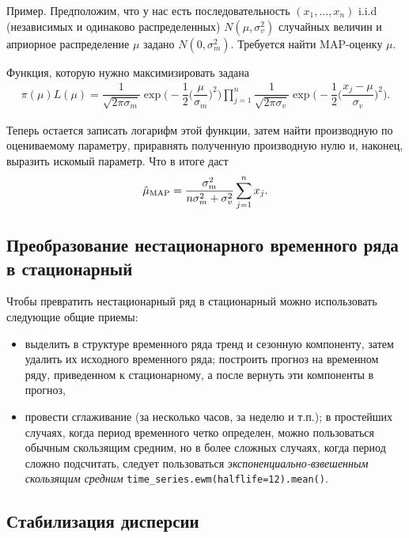 \documentclass[%
	11pt,
	a4paper,
	utf8,
		]{article}
\begin{document}
Пример. Предположим, что у нас есть последовательность $ (x_1, \dots, x_n) $ i.i.d (независимых и одинаково распределенных) $ N(\mu, \sigma_v^2) $ случайных величин и априорное распределение $ \mu $ задано $ N(0, \sigma_m^2) $. Требуется найти MAP-оценку $ \mu $.

Функция, которую нужно максимизировать задана
\begin{align*}
	\pi(\mu)L(\mu) = \dfrac{1}{\sqrt{2\pi \sigma_m}} \exp \Bigg( - \dfrac{1}{2}\Big(\dfrac{\mu}{\sigma_m}\Big)^2 \Bigg) \prod_{j=1}^{n} \dfrac{1}{\sqrt{2\pi \sigma_v}} \exp \Bigg( -\dfrac{1}{2}\Big( \dfrac{x_j - \mu}{\sigma_v} \Big)^2 \Bigg).
\end{align*}

Теперь остается записать логарифм этой функции, затем найти производную по оцениваемому параметру, приравнять полученную производную нулю и, наконец, выразить искомый параметр. Что в итоге даст
\begin{align*}
    \hat{\mu}_{\rm MAP} = \dfrac{\sigma_m^2}{n\sigma_m^2 + \sigma_v^2} \sum_{j=1}^{n}x_j.
\end{align*}





\subsection{Преобразование нестационарного временного ряда в стационарный}

Чтобы превратить нестационарный ряд в стационарный можно использовать следующие общие приемы:
\begin{itemize}
	\item выделить в структуре временного ряда тренд и сезонную компоненту, затем удалить их исходного временного ряда; построить прогноз на временном ряду, приведенном к стационарному, а после вернуть эти компоненты в прогноз,
	
	\item провести сглаживание (за несколько часов, за неделю и т.п.); в простейших случаях, когда период временного четко определен, можно пользоваться обычным скользящим средним, но в более сложных случаях, когда период сложно подсчитать, следует пользоваться \emph{экспоненциально-взвешенным скользящим средним}
	\lstinline{time_series.ewm(halflife=12).mean()}.
\end{itemize}


\subsection{Стабилизация дисперсии}
\end{document}
